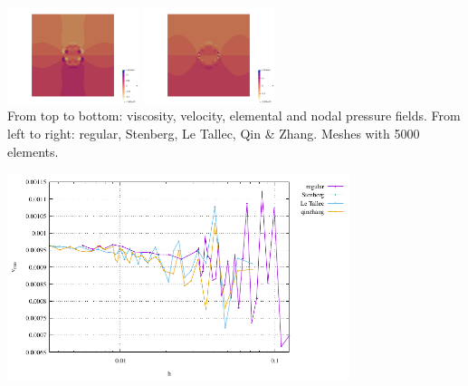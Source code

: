 \begin{center}
\includegraphics[width=3.84cm]{python_codes/fieldstone_78/results/sphere/q2}
\includegraphics[width=3.84cm]{python_codes/fieldstone_78/results/sphere/q3}\\
{\captionfont From top to bottom: viscosity, velocity, elemental and nodal pressure fields. 
From left to right: regular, Stenberg, Le Tallec, Qin \& Zhang. Meshes with 5000 elements.}
\end{center}

\begin{center}
\includegraphics[width=10cm]{python_codes/fieldstone_78/results/sphere/vrms}
\end{center}

